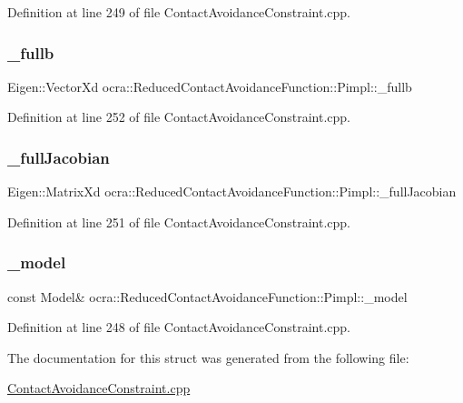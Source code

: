Definition at line 249 of file Contact\+Avoidance\+Constraint.\+cpp.

\hypertarget{structReducedContactAvoidanceFunction_1_1Pimpl_ade6d248f540e91b5b9cfe961981d03a3}{}\label{structReducedContactAvoidanceFunction_1_1Pimpl_ade6d248f540e91b5b9cfe961981d03a3} 
\subsubsection{\texorpdfstring{\+\_\+fullb}{\_fullb}}
{\footnotesize\ttfamily Eigen\+::\+Vector\+Xd ocra\+::\+Reduced\+Contact\+Avoidance\+Function\+::\+Pimpl\+::\+\_\+fullb}



Definition at line 252 of file Contact\+Avoidance\+Constraint.\+cpp.

\hypertarget{structReducedContactAvoidanceFunction_1_1Pimpl_a6ddc277e90776add368eee6a56494f45}{}\label{structReducedContactAvoidanceFunction_1_1Pimpl_a6ddc277e90776add368eee6a56494f45} 
\subsubsection{\texorpdfstring{\+\_\+full\+Jacobian}{\_fullJacobian}}
{\footnotesize\ttfamily Eigen\+::\+Matrix\+Xd ocra\+::\+Reduced\+Contact\+Avoidance\+Function\+::\+Pimpl\+::\+\_\+full\+Jacobian}



Definition at line 251 of file Contact\+Avoidance\+Constraint.\+cpp.

\hypertarget{structReducedContactAvoidanceFunction_1_1Pimpl_acd2bf5f47839d39cb37ac323e038558f}{}\label{structReducedContactAvoidanceFunction_1_1Pimpl_acd2bf5f47839d39cb37ac323e038558f} 
\subsubsection{\texorpdfstring{\+\_\+model}{\_model}}
{\footnotesize\ttfamily const Model\& ocra\+::\+Reduced\+Contact\+Avoidance\+Function\+::\+Pimpl\+::\+\_\+model}



Definition at line 248 of file Contact\+Avoidance\+Constraint.\+cpp.



The documentation for this struct was generated from the following file\+:\begin{DoxyCompactItemize}
\item 
\hyperlink{ContactAvoidanceConstraint_8cpp}{Contact\+Avoidance\+Constraint.\+cpp}\end{DoxyCompactItemize}
